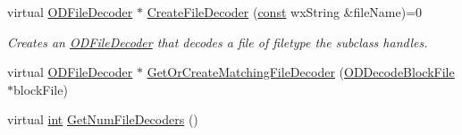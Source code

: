 \begin{DoxyCompactItemize}
virtual \hyperlink{class_o_d_file_decoder}{O\+D\+File\+Decoder} $\ast$ \hyperlink{class_o_d_decode_task_abf936ebc04e953bb29187042e3497143}{Create\+File\+Decoder} (\hyperlink{getopt1_8c_a2c212835823e3c54a8ab6d95c652660e}{const} wx\+String \&file\+Name)=0
\begin{DoxyCompactList}\small\item\em Creates an \hyperlink{class_o_d_file_decoder}{O\+D\+File\+Decoder} that decodes a file of filetype the subclass handles. \end{DoxyCompactList}\item 
virtual \hyperlink{class_o_d_file_decoder}{O\+D\+File\+Decoder} $\ast$ \hyperlink{class_o_d_decode_task_a7298664809e6d58b822fd061fb3fa1f9}{Get\+Or\+Create\+Matching\+File\+Decoder} (\hyperlink{class_o_d_decode_block_file}{O\+D\+Decode\+Block\+File} $\ast$block\+File)
\item 
virtual \hyperlink{xmltok_8h_a5a0d4a5641ce434f1d23533f2b2e6653}{int} \hyperlink{class_o_d_decode_task_a853aab1dad352c81a4605db804bf5d39}{Get\+Num\+File\+Decoders} ()
\end{DoxyCompactItemize}
